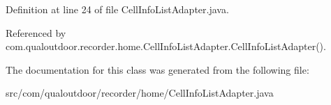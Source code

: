 Definition at line 24 of file Cell\-Info\-List\-Adapter.\-java.



Referenced by com.\-qualoutdoor.\-recorder.\-home.\-Cell\-Info\-List\-Adapter.\-Cell\-Info\-List\-Adapter().



The documentation for this class was generated from the following file\-:\begin{DoxyCompactItemize}
\item 
src/com/qualoutdoor/recorder/home/Cell\-Info\-List\-Adapter.\-java\end{DoxyCompactItemize}
